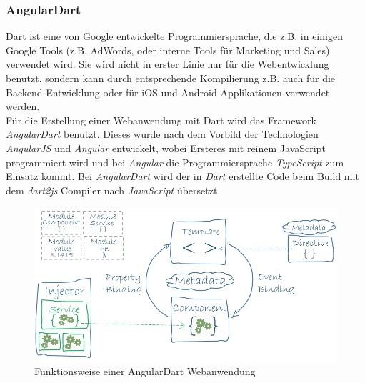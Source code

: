 \subsubsection{AngularDart}
\label{sec:angulardart}

Dart ist eine von Google entwickelte Programmiersprache, die z.B. in einigen Google Tools (z.B. AdWords, oder interne Tools für Marketing und Sales) verwendet wird. Sie wird nicht in erster Linie nur für die Webentwicklung benutzt, sondern kann durch entsprechende Kompilierung z.B. auch für die Backend Entwicklung oder für iOS und Android Applikationen verwendet werden.\\
Für die Erstellung einer Webanwendung mit Dart wird das Framework \textit{AngularDart}\cite{angularDart}  benutzt. Dieses wurde nach dem Vorbild der Technologien \textit{AngularJS} und \textit{Angular} entwickelt, wobei Ersteres mit reinem JavaScript programmiert wird und bei \textit{Angular} die Programmiersprache \textit{TypeScript} zum Einsatz kommt. Bei \textit{AngularDart} wird der in \textit{Dart} erstellte Code beim Build mit dem \textit{dart2js} Compiler nach \textit{JavaScript} übersetzt.

\begin{figure}[h!]
	\centering
	\includegraphics[width=.8\linewidth]{figures/angulardart}
	\caption{Funktionsweise einer AngularDart Webanwendung\cite{angularDart}}
	\label{fig:angulardart}
\end{figure}

